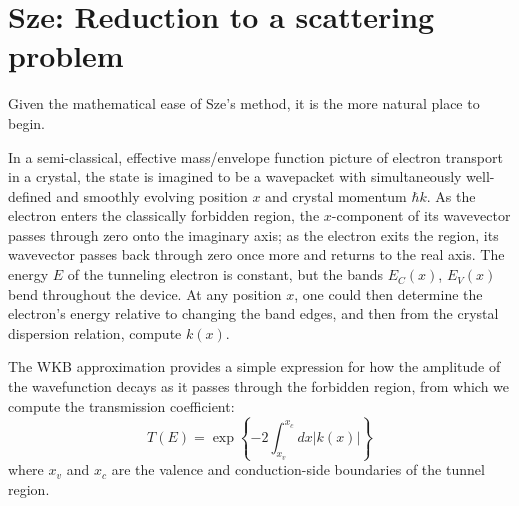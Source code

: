 \section{Sze: Reduction to a scattering problem}
Given the mathematical ease of Sze's method, it is the more natural place to begin.

In a semi-classical, effective mass/envelope function picture of electron transport in a crystal, the state is imagined to be a wavepacket with simultaneously well-defined and smoothly evolving position $x$ and crystal momentum $\hbar k$.  As the electron enters the classically forbidden region, the $x$-component of its wavevector passes through zero onto the imaginary axis; as the electron exits the region, its wavevector passes back through zero once more and returns to the real axis.  The energy $E$ of the tunneling electron is constant, but the bands $E_C(x)$, $E_V(x)$ bend throughout the device.  At any position $x$, one could then determine the electron's energy relative to changing the band edges, and then from the crystal dispersion relation, compute $k(x)$.

The WKB approximation provides a simple expression for how the amplitude of the wavefunction decays as it passes through the forbidden region, from which we compute the transmission coefficient:
$$T(E)=\exp\left\{-2\int_{x_v}^{x_c}dx|k(x)|\right\}$$
where $x_v$ and $x_c$ are the valence and conduction-side boundaries of the tunnel region.